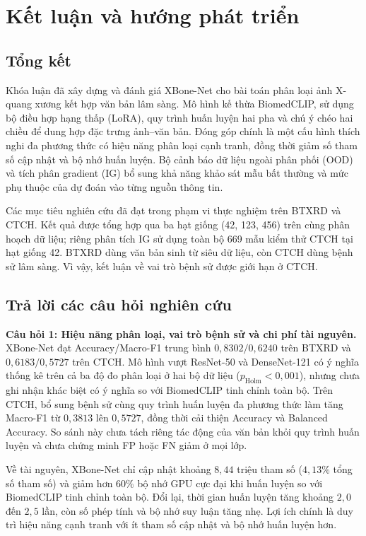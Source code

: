 \chapter{Kết luận và hướng phát triển}

\section{Tổng kết}

Khóa luận đã xây dựng và đánh giá XBone-Net cho bài toán phân loại ảnh X-quang xương kết hợp văn bản lâm sàng. Mô hình kế thừa BiomedCLIP, sử dụng bộ điều hợp hạng thấp (LoRA), quy trình huấn luyện hai pha và chú ý chéo hai chiều để dung hợp đặc trưng ảnh--văn bản. Đóng góp chính là một cấu hình thích nghi đa phương thức có hiệu năng phân loại cạnh tranh, đồng thời giảm số tham số cập nhật và bộ nhớ huấn luyện. Bộ cảnh báo dữ liệu ngoài phân phối (OOD) và tích phân gradient (IG) bổ sung khả năng khảo sát mẫu bất thường và mức phụ thuộc của dự đoán vào từng nguồn thông tin.

Các mục tiêu nghiên cứu đã đạt trong phạm vi thực nghiệm trên BTXRD và CTCH. Kết quả được tổng hợp qua ba hạt giống (42, 123, 456) trên cùng phân hoạch dữ liệu; riêng phân tích IG sử dụng toàn bộ 669 mẫu kiểm thử CTCH tại hạt giống 42. BTXRD dùng văn bản sinh từ siêu dữ liệu, còn CTCH dùng bệnh sử lâm sàng. Vì vậy, kết luận về vai trò bệnh sử được giới hạn ở CTCH.

\section{Trả lời các câu hỏi nghiên cứu}

\textbf{Câu hỏi 1: Hiệu năng phân loại, vai trò bệnh sử và chi phí tài nguyên.}
XBone-Net đạt Accuracy/Macro-F1 trung bình $0{,}8302/0{,}6240$ trên BTXRD và $0{,}6183/0{,}5727$ trên CTCH. Mô hình vượt ResNet-50 và DenseNet-121 có ý nghĩa thống kê trên cả ba độ đo phân loại ở hai bộ dữ liệu ($p_{\mathrm{Holm}} < 0{,}001$), nhưng chưa ghi nhận khác biệt có ý nghĩa so với BiomedCLIP tinh chỉnh toàn bộ. Trên CTCH, bổ sung bệnh sử cùng quy trình huấn luyện đa phương thức làm tăng Macro-F1 từ $0{,}3813$ lên $0{,}5727$, đồng thời cải thiện Accuracy và Balanced Accuracy. So sánh này chưa tách riêng tác động của văn bản khỏi quy trình huấn luyện và chưa chứng minh FP hoặc FN giảm ở mọi lớp.

Về tài nguyên, XBone-Net chỉ cập nhật khoảng $8{,}44$ triệu tham số ($4{,}13\%$ tổng số tham số) và giảm hơn $60\%$ bộ nhớ GPU cực đại khi huấn luyện so với BiomedCLIP tinh chỉnh toàn bộ. Đổi lại, thời gian huấn luyện tăng khoảng $2{,}0$ đến $2{,}5$ lần, còn số phép tính và bộ nhớ suy luận tăng nhẹ. Lợi ích chính là duy trì hiệu năng cạnh tranh với ít tham số cập nhật và bộ nhớ huấn luyện hơn.

